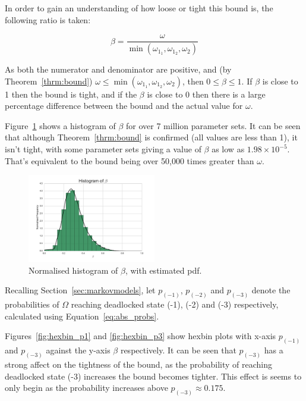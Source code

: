 \documentclass{article}
\numberwithin{equation}{section}
\begin{document}
In order to gain an understanding of how loose or tight this bound is, the following ratio is taken:

\begin{equation}
\beta = \frac{\omega}{\min(\omega_{1_1}, \omega_{1_2}, \omega_2)}
\end{equation}

As both the numerator and denominator are positive, and (by Theorem~\ref{thrm:bound}) $\omega \leq \min(\omega_{1_1}, \omega_{1_2}, \omega_2)$, then $0 \leq \beta \leq 1$.
If $\beta$ is close to 1 then the bound is tight, and if the $\beta$ is close to 0 then there is a large percentage difference between the bound and the actual value for $\omega$.

Figure~\ref{fig:bound_ratio_hist} shows a histogram of $\beta$ for over 7 million parameter sets.
It can be seen that although Theorem~\ref{thrm:bound} is confirmed (all values are less than 1), it isn't tight, with some parameter sets giving a value of $\beta$ as low as $1.98 \times 10^{-5}$.
That's equivalent to the bound being over 50,000 times greater than $\omega$.

\begin{figure}[!htbp]
  \begin{center}
  \includegraphics[width=0.5\textwidth]{images/ratio_actual_bound}
  \end{center}
  \caption{Normalised histogram of $\beta$, with estimated pdf.}
  \label{fig:bound_ratio_hist}
\end{figure}

Recalling Section~\ref{sec:markovmodels}, let $p_{(-1)}$, $p_{(-2)}$ and $p_{(-3)}$ denote the probabilities of $\Omega$ reaching deadlocked state (-1), (-2) and (-3) respectively, calculated using Equation~\ref{eq:abs_probs}.

Figures~\ref{fig:hexbin_p1} and \ref{fig:hexbin_p3} show hexbin plots with x-axis $p_{(-1)}$ and $p_{(-3)}$ against the y-axis $\beta$ respectively.
It can be seen that $p_{(-3)}$ has a strong affect on the tightness of the bound, as the probability of reaching deadlocked state (-3) increases the bound becomes tighter.
This effect is seems to only begin as the probability increases above $p_{(-3)} \approx 0.175$.
\end{document}

